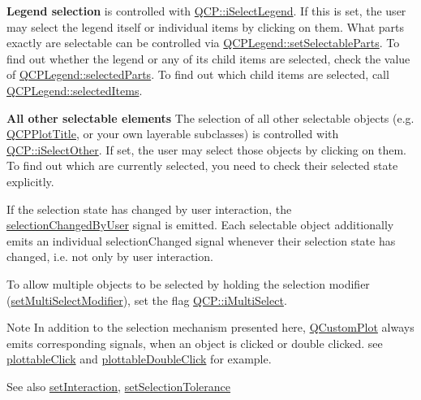 {\bfseries Legend selection} is controlled with \hyperlink{namespace_q_c_p_a2ad6bb6281c7c2d593d4277b44c2b037a269c9af298e257d1108edec0432b5513}{Q\+C\+P\+::i\+Select\+Legend}. If this is set, the user may select the legend itself or individual items by clicking on them. What parts exactly are selectable can be controlled via \hyperlink{class_q_c_p_legend_a9ce60aa8bbd89f62ae4fa83ac6c60110}{Q\+C\+P\+Legend\+::set\+Selectable\+Parts}. To find out whether the legend or any of its child items are selected, check the value of \hyperlink{class_q_c_p_legend_abbbf1b2d6a149013527ed87b0780894a}{Q\+C\+P\+Legend\+::selected\+Parts}. To find out which child items are selected, call \hyperlink{class_q_c_p_legend_ac93eaf236e911d67aa8b88942ef45c5e}{Q\+C\+P\+Legend\+::selected\+Items}.

{\bfseries All other selectable elements} The selection of all other selectable objects (e.\+g. \hyperlink{class_q_c_p_plot_title}{Q\+C\+P\+Plot\+Title}, or your own layerable subclasses) is controlled with \hyperlink{namespace_q_c_p_a2ad6bb6281c7c2d593d4277b44c2b037af67a50bc26147a13b551b3a625374949}{Q\+C\+P\+::i\+Select\+Other}. If set, the user may select those objects by clicking on them. To find out which are currently selected, you need to check their selected state explicitly.

If the selection state has changed by user interaction, the \hyperlink{class_q_custom_plot_a500c64a109bc773c973ad274f2fa4190}{selection\+Changed\+By\+User} signal is emitted. Each selectable object additionally emits an individual selection\+Changed signal whenever their selection state has changed, i.\+e. not only by user interaction.

To allow multiple objects to be selected by holding the selection modifier (\hyperlink{class_q_custom_plot_a8fc96e3b5138a06759a2a90c166df516}{set\+Multi\+Select\+Modifier}), set the flag \hyperlink{namespace_q_c_p_a2ad6bb6281c7c2d593d4277b44c2b037aef673112c5067c3cf4cfddb62da7265d}{Q\+C\+P\+::i\+Multi\+Select}.

\begin{DoxyNote}{Note}
In addition to the selection mechanism presented here, \hyperlink{class_q_custom_plot}{Q\+Custom\+Plot} always emits corresponding signals, when an object is clicked or double clicked. see \hyperlink{class_q_custom_plot_a57e5efa8a854620e9bf62d31fc139f53}{plottable\+Click} and \hyperlink{class_q_custom_plot_af2e6f1cea923dae437681d01ce7d0c31}{plottable\+Double\+Click} for example.
\end{DoxyNote}
\begin{DoxySeeAlso}{See also}
\hyperlink{class_q_custom_plot_a422bf1bc6d56dac75a3d805d9a65902c}{set\+Interaction}, \hyperlink{class_q_custom_plot_a4dc31241d7b09680950e19e5f971ed93}{set\+Selection\+Tolerance} 
\end{DoxySeeAlso}



